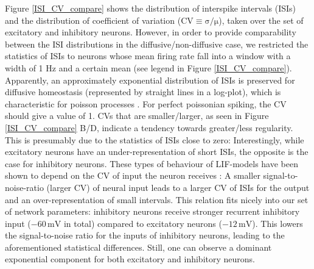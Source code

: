 \documentclass[10pt,a4paper]{article}
\begin{document}
Figure \ref{ISI_CV_compare} shows the distribution of interspike intervals (ISIs) and the distribution of coefficient of variation ($\mathrm{CV\equiv\sigma/\mu}$), taken over the set of excitatory and inhibitory neurons. However, in order to provide comparability between the ISI distributions in the diffusive/non-diffusive case, we restricted the statistics of ISIs to neurons whose mean firing rate fall into a window with a width of 1 Hz and a certain mean (see legend in Figure \ref{ISI_CV_compare}). Apparently, an approximately exponential distribution of ISIs is preserved for diffusive homeostasis (represented by straight lines in a log-plot), which is characteristic for poisson processes \cite[p. 27]{Theor_Neur_Dayan}. For perfect poissonian spiking, the CV should give a value of 1. CVs that are smaller/larger, as seen in Figure \ref{ISI_CV_compare} B/D, indicate a tendency towards greater/less regularity. This is presumably due to the statistics of ISIs close to zero: Interestingly, while excitatory neurons have an  under-representation of short ISIs, the opposite is the case for inhibitory neurons. These types of behaviour of LIF-models have been shown to depend on the CV of input the neuron receives \cite{Ostojic2011}: A smaller signal-to-noise-ratio (larger CV) of neural input leads to a larger CV of ISIs for the output and an over-representation of small intervals. This relation fits nicely into our set of network parameters: inhibitory neurons receive stronger recurrent inhibitory input ($\mathrm{-60\,mV}$ in total) compared to excitatory neurons ($\mathrm{-12\,mV}$). This lowers the signal-to-noise ratio for the inputs of inhibitory neurons, leading to the aforementioned statistical differences. Still, one can observe a dominant exponential component for both excitatory and inhibitory neurons.
\end{document}
